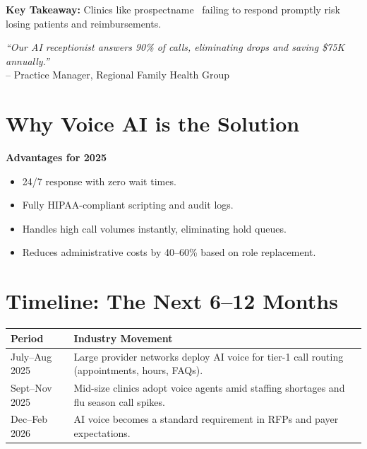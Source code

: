 \documentclass[11pt]{article}
\newcommand{\prospectname}{{ prospectname }}
\begin{document}
\textbf{Key Takeaway:} Clinics like \prospectname\ failing to respond promptly risk losing patients and reimbursements.

\vspace{0.8cm}
\begin{flushright}
    \textit{``Our AI receptionist answers 90\% of calls, eliminating drops and saving \$75K annually.''} \\
    -- Practice Manager, Regional Family Health Group
\end{flushright}

\vspace{1cm}

\section*{Why Voice AI is the Solution}
\textbf{Advantages for 2025}
\begin{itemize}
    \item 24/7 response with zero wait times.
    \item Fully HIPAA-compliant scripting and audit logs.
    \item Handles high call volumes instantly, eliminating hold queues.
    \item Reduces administrative costs by 40--60\% based on role replacement.
\end{itemize}

\vspace{1cm}

\section*{Timeline: The Next 6--12 Months}
\begin{tabular}{>{\raggedright\arraybackslash}p{3.5cm} >{\raggedright\arraybackslash}p{9cm}}
    \toprule
    \textbf{Period} & \textbf{Industry Movement} \\
    \midrule
    \addlinespace[0.3cm]
    July--Aug 2025 & Large provider networks deploy AI voice for tier-1 call routing (appointments, hours, FAQs). \\
    \addlinespace[0.3cm]
    Sept--Nov 2025 & Mid-size clinics adopt voice agents amid staffing shortages and flu season call spikes. \\
    \addlinespace[0.3cm]
    Dec--Feb 2026 & AI voice becomes a standard requirement in RFPs and payer expectations. \\
    \bottomrule
\end{tabular}
\end{document}
